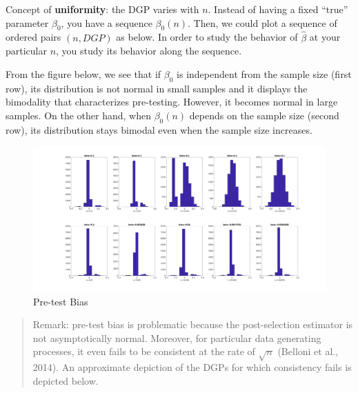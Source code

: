 \documentclass[12pt,]{book}
\begin{document}
Concept of \textbf{uniformity}: the DGP varies with \(n\). Instead of having a fixed ``true'' parameter \(\beta_0\), you have a sequence \(\beta_0(n)\). Then, we could plot a sequence of ordered pairs \((n, DGP)\) as below. In order to study the behavior of \(\hat{\beta}\) at your particular \(n\), you study its behavior along the sequence.

From the figure below, we see that if \(\beta_0\) is independent from the sample size (first row), its distribution is not normal in small samples and it displays the bimodality that characterizes pre-testing. However, it becomes normal in large samples. On the other hand, when \(\beta_0(n)\) depends on the sample size (second row), its distribution stays bimodal even when the sample size increases.

\begin{figure}
\centering
\includegraphics{figures/Fig_624.png}
\caption{Pre-test Bias}
\end{figure}

\begin{quote}
Remark: pre-test bias is problematic because the post-selection estimator is not asymptotically normal. Moreover, for particular data generating processes, it even fails to be consistent at the rate of \(\sqrt{n}\) (Belloni et al., 2014). An approximate depiction of the DGPs for which consistency fails is depicted below.
\end{quote}
\end{document}
